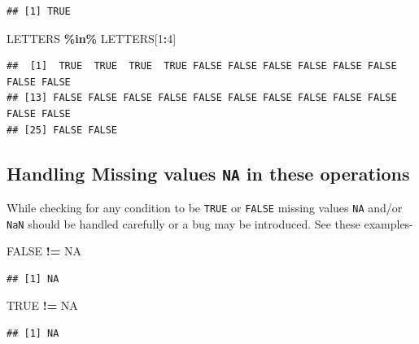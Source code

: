 \documentclass[
]{book}
\newenvironment{Shaded}{\begin{snugshade}}{\end{snugshade}}
\newcommand{\ConstantTok}[1]{\textcolor[rgb]{0.56,0.35,0.01}{#1}}
\newcommand{\DecValTok}[1]{\textcolor[rgb]{0.00,0.00,0.81}{#1}}
\newcommand{\NormalTok}[1]{#1}
\newcommand{\SpecialCharTok}[1]{\textcolor[rgb]{0.81,0.36,0.00}{\textbf{#1}}}
\begin{document}
\begin{verbatim}
## [1] TRUE
\end{verbatim}

\begin{Shaded}
\begin{Highlighting}[]
\NormalTok{LETTERS }\SpecialCharTok{\%in\%}\NormalTok{ LETTERS[}\DecValTok{1}\SpecialCharTok{:}\DecValTok{4}\NormalTok{]}
\end{Highlighting}
\end{Shaded}

\begin{verbatim}
##  [1]  TRUE  TRUE  TRUE  TRUE FALSE FALSE FALSE FALSE FALSE FALSE FALSE FALSE
## [13] FALSE FALSE FALSE FALSE FALSE FALSE FALSE FALSE FALSE FALSE FALSE FALSE
## [25] FALSE FALSE
\end{verbatim}

\hypertarget{handling-missing-values-na-in-these-operations}{%
\subsection*{\texorpdfstring{Handling Missing values \texttt{NA} in these operations}{Handling Missing values NA in these operations}}\label{handling-missing-values-na-in-these-operations}}

While checking for any condition to be \texttt{TRUE} or \texttt{FALSE} missing values \texttt{NA} and/or \texttt{NaN} should be handled carefully or a bug may be introduced. See these examples-

\begin{Shaded}
\begin{Highlighting}[]
\ConstantTok{FALSE} \SpecialCharTok{!=} \ConstantTok{NA}
\end{Highlighting}
\end{Shaded}

\begin{verbatim}
## [1] NA
\end{verbatim}

\begin{Shaded}
\begin{Highlighting}[]
\ConstantTok{TRUE} \SpecialCharTok{!=} \ConstantTok{NA}
\end{Highlighting}
\end{Shaded}

\begin{verbatim}
## [1] NA
\end{verbatim}
\end{document}
